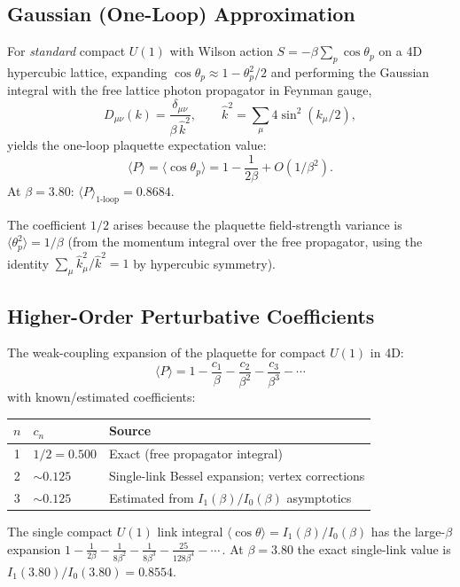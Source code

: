 \documentclass[11pt]{article}
\begin{document}
\subsection{Gaussian (One-Loop) Approximation}

For \emph{standard} compact $U(1)$ with Wilson action
$S = -\beta\sum_p \cos\theta_p$ on a 4D hypercubic lattice,
expanding $\cos\theta_p \approx 1 - \theta_p^2/2$ and performing
the Gaussian integral with the free lattice photon propagator
in Feynman gauge,
\[
  D_{\mu\nu}(k) = \frac{\delta_{\mu\nu}}{\beta\,\hat{k}^2}, \qquad
  \hat{k}^2 = \sum_\mu 4\sin^2(k_\mu/2),
\]
yields the one-loop plaquette expectation value:
\begin{equation}\label{eq:P_oneloop}
  \langle P\rangle = \langle\cos\theta_p\rangle
  = 1 - \frac{1}{2\beta} + O(1/\beta^2).
\end{equation}
At $\beta = 3.80$: $\langle P\rangle_{\text{1-loop}} = 0.8684$.

The coefficient $1/2$ arises because the plaquette field-strength
variance is $\langle\theta_p^2\rangle = 1/\beta$ (from the momentum
integral over the free propagator, using the identity
$\sum_\mu \hat{k}_\mu^2/\hat{k}^2 = 1$ by hypercubic symmetry).

\subsection{Higher-Order Perturbative Coefficients}

The weak-coupling expansion of the plaquette for compact $U(1)$ in 4D:
\begin{equation}\label{eq:P_series}
  \langle P\rangle = 1 - \frac{c_1}{\beta} - \frac{c_2}{\beta^2}
  - \frac{c_3}{\beta^3} - \cdots
\end{equation}
with known/estimated coefficients:
\begin{center}
\begin{tabular}{cll}
\toprule
$n$ & $c_n$ & Source \\
\midrule
1 & $1/2 = 0.500$ & Exact (free propagator integral) \\
2 & $\sim 0.125$ & Single-link Bessel expansion; vertex corrections \\
3 & $\sim 0.125$ & Estimated from $I_1(\beta)/I_0(\beta)$ asymptotics \\
\bottomrule
\end{tabular}
\end{center}
The single compact $U(1)$ link integral $\langle\cos\theta\rangle
= I_1(\beta)/I_0(\beta)$ has the large-$\beta$ expansion
$1 - \frac{1}{2\beta} - \frac{1}{8\beta^2} - \frac{1}{8\beta^3}
- \frac{25}{128\beta^4} - \cdots$\,.
At $\beta = 3.80$ the exact single-link value is
$I_1(3.80)/I_0(3.80) = 0.8554$.
\end{document}
